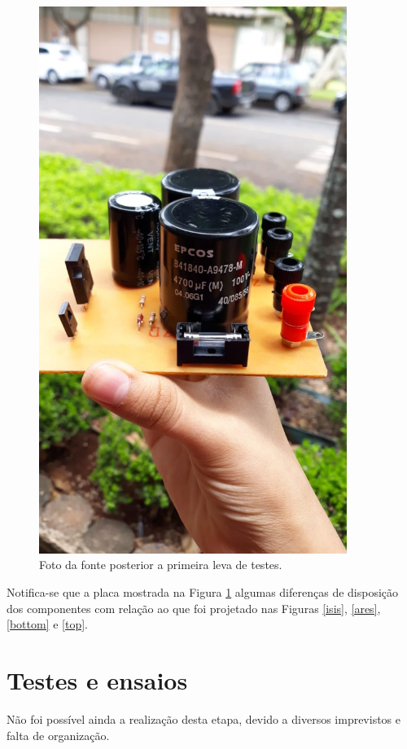 \documentclass[a4paper,12pt,oneside,openany,table,xcdraw]{article}
\begin{document}
\begin{figure}[H]
\centering
\captionsetup{font=scriptsize}
\includegraphics[width=10cm]{foto}
\caption{Foto da fonte posterior a primeira leva de testes.}
\label{foto}
\end{figure}

Notifica-se que a placa mostrada na Figura \ref{foto} algumas diferenças de disposição dos componentes com relação ao que foi projetado nas Figuras \ref{isis}, \ref{ares}, \ref{bottom} e \ref{top}.

\section{Testes e ensaios}
Não foi possível ainda a realização desta etapa, devido a diversos imprevistos e falta de organização.
\end{document}
